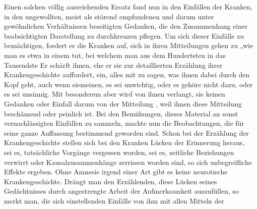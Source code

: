 \documentclass[twoside=true,titlepage=false,open=any, parskip=never, fontsize=10pt, headings=small, chapterprefix=false, appendixprefix=false]{scrbook}
\begin{document}
            
        \pstart
        Einen solchen völlig ausreichenden Ersatz fand nun  in den Einfällen der Kranken,  in den ungewollten, meist als störend empfundenen und darum unter
               gewöhnlichen Verhältnissen beseitigten Gedanken, die den Zusammenhang einer
               beabsichtigten Darstellung zu durchkreuzen pflegen. Um sich dieser Einfälle zu
               bemächtigen, fordert er die Kranken auf, sich in ihren Mitteilungen gehen zu „wie man es etwa in einem 
               tut, bei welchem man aus dem
               Hundertsten in das Tausendste  Er schärft ihnen, ehe er sie zur detaillierten Erzählung ihrer
               Krankengeschichte auffordert, ein, alles mit zu sagen, was ihnen dabei durch den
               Kopf geht, auch wenn siemeinen, es sei unwichtig, oder es gehöre nicht dazu, oder es sei
               unsinnig. Mit besonderem  aber wird von ihnen verlangt,  sie keinen Gedanken oder Einfall darum von der Mitteilung , weil ihnen diese Mitteilung beschämend oder peinlich ist. Bei den
               Bemühungen, dieses Material an sonst vernachlässigten Einfällen zu sammeln,
               machte nun  die Beobachtungen, die für
               seine ganze Auffassung bestimmend geworden sind. Schon bei der Erzählung der Krankengeschichte stellen
               sich bei den Kranken Lücken der Erinnerung heraus, sei es,  tatsächliche Vorgänge vergessen worden, sei es,  zeitliche Beziehungen verwirrt oder Kausalzusammenhänge zerrissen worden sind, so  sich unbegreifliche Effekte ergeben. Ohne Amnesie irgend einer Art gibt
               es keine neurotische Krankengeschichte. Drängt man den Erzählenden,
               diese Lücken seines Gedächtnisses durch angestrengte Arbeit der Aufmerksamkeit
                  auszufüllen, so merkt man,  die  sich einstellenden Einfälle von ihm mit allen Mitteln der
\end{document}
